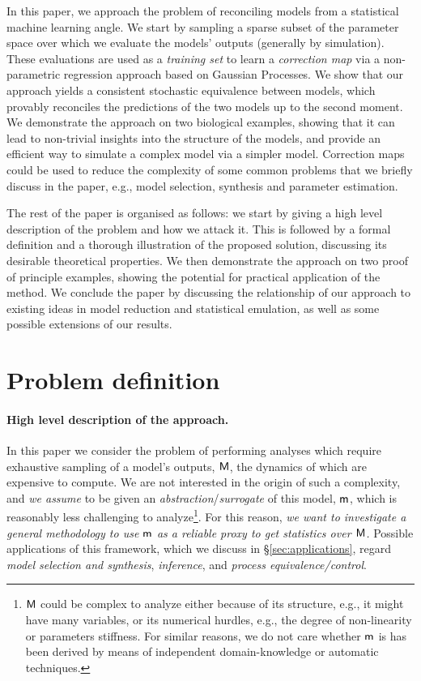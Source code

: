 \documentclass[runningheads,a4paper]{llncs}
\newcommand{\bM}{{\sf{M}}}
\newcommand{\bm}{{\sf{m}}}
\begin{document}
In this paper, we approach the problem of reconciling models from a statistical machine learning angle. We start by sampling a sparse subset of the parameter space over which we evaluate the models' outputs (generally by simulation). These evaluations are used as a {\it training set} to learn a {\it correction map} via a non-parametric regression approach based on Gaussian Processes. We show that our approach yields a consistent stochastic equivalence between models, which provably reconciles the predictions of the two models up to the second moment. We demonstrate the approach on two biological examples, showing that it can lead to non-trivial insights into the structure of the models, and provide an efficient way to simulate a complex model via a simpler model. Correction maps could be used to reduce the complexity of some common problems that we briefly discuss in the paper,  e.g., model selection, synthesis and parameter estimation.

The rest of the paper is organised as follows: we start by giving a high level description of the problem and how we attack it. This is followed by a formal definition and a thorough illustration of the proposed solution, discussing its desirable theoretical properties. We then demonstrate the approach on two proof of principle examples, showing the potential for practical application of the method. We conclude the paper by discussing the relationship of our approach to existing ideas in model reduction and statistical emulation, as well as some possible extensions of our results.


\section{Problem definition}


\paragraph{High level description of the approach.}
In this paper we consider the problem of performing analyses which require exhaustive sampling of a model's outputs, $\bM$,  the dynamics of which are expensive to compute. 
We are not interested in the origin of such a complexity, and {\em we assume} to be given an {\em abstraction}/{\em surrogate}  of this model, $\bm$,  which is reasonably less challenging to analyze\footnote{$\bM$ could be complex to analyze  either because of its structure, e.g., it might have many variables, or its numerical hurdles, e.g., the degree of non-linearity or parameters stiffness. For   similar reasons, we do not care whether $\bm$ is has been derived by means of independent domain-knowledge or automatic techniques.}.  For this reason, {\em we want to investigate a general methodology to use $\bm$    as a reliable proxy to get  statistics over $\bM$.}  Possible   applications of this framework, which we discuss in  \S\ref{sec:applications}, regard {\em model selection and synthesis},  {\em inference}, and {\em process equivalence/control}. 
\end{document}
